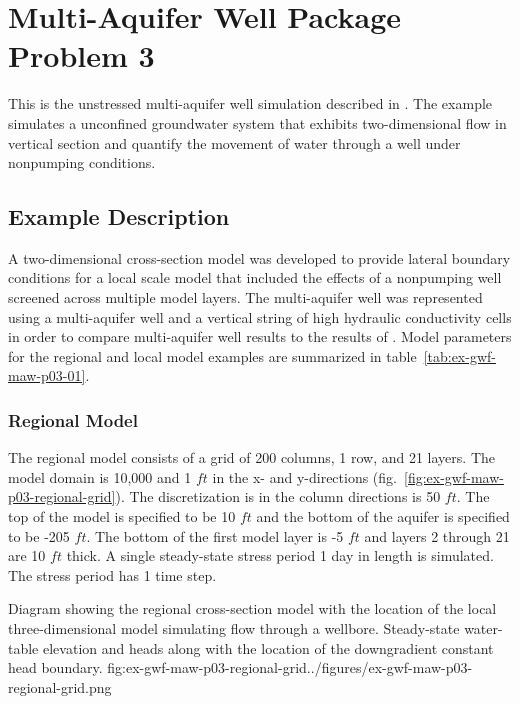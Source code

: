 \section{Multi-Aquifer Well Package Problem 3}

This is the unstressed multi-aquifer well simulation described in \cite{reilly1989bias}. The example simulates a unconfined groundwater system that exhibits two-dimensional flow in vertical section and quantify the movement of water through a well under nonpumping conditions.                               

\subsection{Example Description}

A two-dimensional cross-section model was developed to provide lateral boundary conditions for a local scale model that included the effects of a nonpumping well screened across multiple model layers. The multi-aquifer well was represented using a multi-aquifer well and a vertical string of high hydraulic conductivity cells in order to compare multi-aquifer well results to the results of \cite{reilly1989bias}. Model parameters for the regional and local model examples are summarized in table~\ref{tab:ex-gwf-maw-p03-01}.



\subsubsection{Regional Model}

The regional model consists of a grid of 200 columns, 1 row, and 21 layers. The model domain is 10,000 and 1 $ft$ in the x- and y-directions (fig.~\ref{fig:ex-gwf-maw-p03-regional-grid}). The discretization is in the column directions is 50 $ft$. The top of the model is specified to be 10 $ft$ and the bottom of the aquifer is specified to be -205 $ft$. The bottom of the first model layer is -5 $ft$ and layers 2 through 21 are 10 $ft$ thick. A single steady-state stress period 1 day in length is simulated. The stress period has 1 time step.

\begin{StandardFigure}{
                                     Diagram showing the regional cross-section model with the location of the 
                                     local three-dimensional model simulating flow through a wellbore. Steady-state
                                     water-table elevation and heads along with the location of the downgradient 
                                     constant head boundary.
                                     }{fig:ex-gwf-maw-p03-regional-grid}{../figures/ex-gwf-maw-p03-regional-grid.png}
\end{StandardFigure}   


